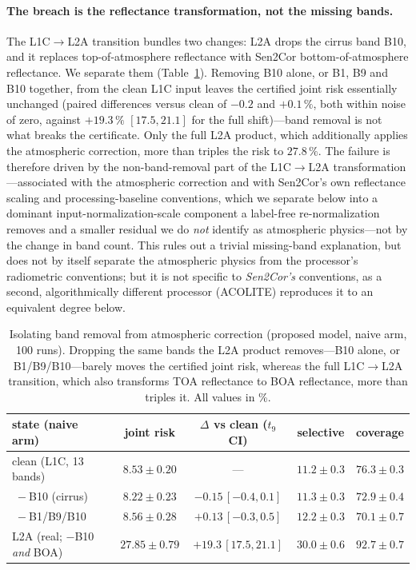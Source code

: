 \documentclass[preprint,3p,times]{elsarticle}
\begin{document}
\paragraph{The breach is the reflectance transformation, not the missing bands.} The L1C$\to$L2A transition bundles two changes: L2A drops the cirrus band B10, and it replaces top-of-atmosphere reflectance with Sen2Cor bottom-of-atmosphere reflectance. We separate them (Table~\ref{tab:banddrop}). Removing B10 alone, or B1, B9 and B10 together, from the clean L1C input leaves the certified joint risk essentially unchanged (paired differences versus clean of $-0.2$ and $+0.1\,\%$, both within noise of zero, against $+19.3\,\%$ $[17.5,21.1]$ for the full shift)---band removal is not what breaks the certificate. Only the full L2A product, which additionally applies the atmospheric correction, more than triples the risk to $27.8\,\%$. The failure is therefore driven by the non-band-removal part of the L1C$\to$L2A transformation---associated with the atmospheric correction and with Sen2Cor's own reflectance scaling and processing-baseline conventions, which we separate below into a dominant input-normalization-scale component a label-free re-normalization removes and a smaller residual we do \emph{not} identify as atmospheric physics---not by the change in band count. This rules out a trivial missing-band explanation, but does not by itself separate the atmospheric physics from the processor's radiometric conventions; but it is not specific to \emph{Sen2Cor's} conventions, as a second, algorithmically different processor (ACOLITE) reproduces it to an equivalent degree below.

\begin{table}[t]
\centering
\caption{Isolating band removal from atmospheric correction (proposed model, naive arm, 100 runs). Dropping the same bands the L2A product removes---B10 alone, or B1/B9/B10---barely moves the certified joint risk, whereas the full L1C$\to$L2A transition, which also transforms TOA reflectance to BOA reflectance, more than triples it. All values in \%.}
\label{tab:banddrop}
\begin{tabular}{lcccc}
\toprule
state (naive arm) & joint risk & $\Delta$ vs clean ($t_9$ CI) & selective & coverage \\
\midrule
clean (L1C, 13 bands)              & $8.53\pm0.20$ & --- & $11.2\pm0.3$ & $76.3\pm0.3$ \\
$\;-$B10 (cirrus)                  & $8.22\pm0.23$ & $-0.15\,[-0.4,0.1]$ & $11.3\pm0.3$ & $72.9\pm0.4$ \\
$\;-$B1/B9/B10                     & $8.56\pm0.28$ & $+0.13\,[-0.3,0.5]$ & $12.2\pm0.3$ & $70.1\pm0.7$ \\
L2A (real; $-$B10 \emph{and} BOA)  & $\mathbf{27.85\pm0.79}$ & $\mathbf{+19.3\,[17.5,21.1]}$ & $30.0\pm0.6$ & $92.7\pm0.7$ \\
\bottomrule
\end{tabular}
\end{table}
\end{document}
